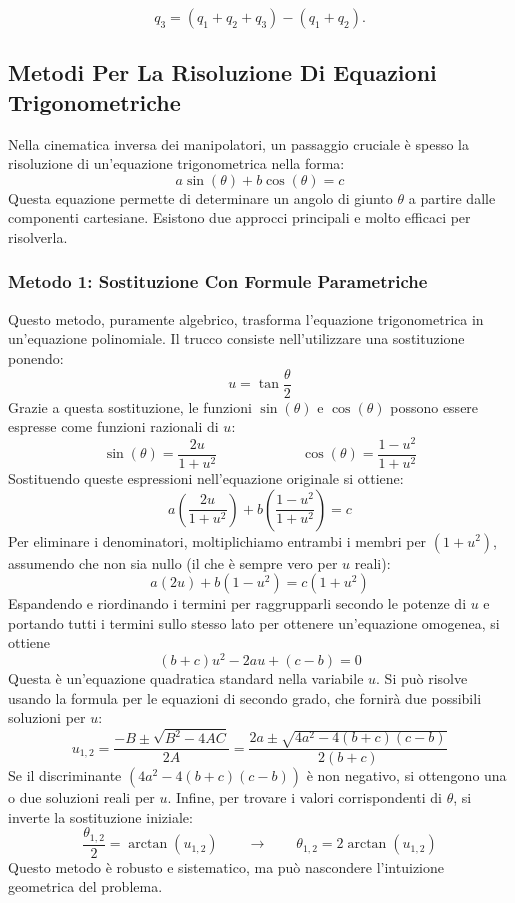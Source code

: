 ﻿\documentclass[11pt, a4paper]{article}
\begin{document}
\[
q_3 = (q_1 + q_2 + q_3) - (q_1 + q_2).
\]

\newpage
\subsection*{Metodi Per La Risoluzione Di Equazioni Trigonometriche}

Nella cinematica inversa dei manipolatori, un passaggio cruciale è spesso la risoluzione di un'equazione trigonometrica nella forma:
\[
    a \sin(\theta) + b \cos(\theta) = c
\]
Questa equazione permette di determinare un angolo di giunto \( \theta \) a partire dalle componenti cartesiane. Esistono due approcci principali e molto efficaci per risolverla.

\subsubsection*{Metodo 1: Sostituzione Con Formule Parametriche}

Questo metodo, puramente algebrico, trasforma l'equazione trigonometrica in un'equazione polinomiale. Il trucco consiste nell'utilizzare una sostituzione ponendo:
\[
    u = \tan \frac{\theta}{2}
\]
Grazie a questa sostituzione, le funzioni \( \sin(\theta) \) e \( \cos(\theta) \) possono essere espresse come funzioni razionali di \( u \):
\[
    \sin(\theta) = \frac{2u}{1 + u^2} \qquad \qquad \qquad \cos(\theta) = \frac{1 - u^2}{1 + u^2}
\]
Sostituendo queste espressioni nell'equazione originale si ottiene:
\[
    a \left( \frac{2u}{1 + u^2} \right) + b \left( \frac{1 - u^2}{1 + u^2} \right) = c
\]
Per eliminare i denominatori, moltiplichiamo entrambi i membri per \( (1 + u^2) \), assumendo che non sia nullo (il che è sempre vero per \( u \) reali):
\[
    a(2u) + b(1 - u^2) = c(1 + u^2)
\]
Espandendo e riordinando i termini per raggrupparli secondo le potenze di \( u \) e portando tutti i termini sullo stesso lato per ottenere un'equazione omogenea, si ottiene
\[
    (b + c)u^2 - 2au + (c - b) = 0
\]
Questa è un'equazione quadratica standard nella variabile \( u \). Si può risolve usando la formula per le equazioni di secondo grado, che fornirà due possibili soluzioni per \( u \):
\[
    u_{1,2} = \frac{-B \pm \sqrt{B^2 - 4AC}}{2A} = \frac{2a \pm \sqrt{4a^{2} - 4(b+c)(c-b)}}{2(b+c)}
\]
Se il discriminante \( (4a^2 - 4(b+c)(c-b)) \) è non negativo, si ottengono una o due soluzioni reali per \( u \). Infine, per trovare i valori corrispondenti di \( \theta \), si inverte la sostituzione iniziale:
\[
    \frac{\theta_{1,2}}{2} = \arctan(u_{1,2}) \qquad \longrightarrow \qquad \theta_{1,2} = 2 \arctan(u_{1,2})
\]
Questo metodo è robusto e sistematico, ma può nascondere l'intuizione geometrica del problema.
\end{document}
